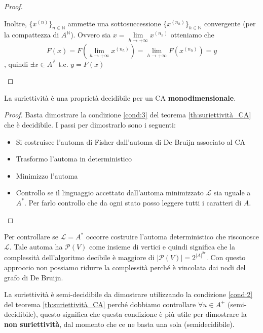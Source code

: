 \begin{teorema}
\begin{proof}
\begin{itemize}
                  Inoltre, $\{x^{(n)}\}_{n\in \mathbb{N}}$ ammette una sottosuccessione
                  $\{x^{(n_h)}\}_{h\in \mathbb{N}}$ convergente (per la compattezza di $A^{\mathbb{N}}$).
                  Ovvero sia $x= \lim\limits_{h\rightarrow +\infty}x ^{(n_h)}$ otteniamo  che $$ F(x)= F(\lim\limits_{h\rightarrow +\infty}x ^{(n_h)}) = \lim\limits_{h\rightarrow +\infty} F(x^{(n_h)})=y$$,
                  quindi $\exists x \in A^\mathbb{Z}$ t.c. $y = F(x)$
        \end{itemize}
    \end{proof}
\end{teorema}

\begin{teorema}
    La suriettività è una proprietà decidibile per un CA \textbf{monodimensionale}.
    \begin{proof}
        Basta dimostrare la condizione \ref{cond:3} del teorema \ref{th:suriettività_CA}
        che è decidibile. I passi per dimostrarlo sono i seguenti:
        \begin{itemize}
            \item Si costruisce l'automa di Fisher dall'automa di De Bruijn associato al CA
            \item Trasformo l'automa in deterministico
            \item Minimizzo l'automa
            \item Controllo se il linguaggio accettato dall'automa minimizzato $\mathcal{L}$ sia
                  uguale a $A^\ast$. Per farlo controllo che da ogni stato posso leggere
                  tutti i caratteri di $A$.
        \end{itemize}
    \end{proof}
\end{teorema}
\begin{nota}
    Per controllare se $\mathcal{L} = A^\ast$ occorre costruire l'automa deterministico
    che risconosce $ \mathcal{L}$. Tale automa ha $\mathcal{P}(V)$ come insieme di
    vertici e quindi significa che la complessità dell'algoritmo decibile è maggiore
    di $|\mathcal{P}(V)| = 2^{|A|^{2r}}$. Con questo approccio non possiamo ridurre
    la complessità perché è vincolata dai nodi del grafo di De Bruijn.
\end{nota}

\begin{nota}
    La suriettività è semi-decidibile da dimostrare utilizzando la condizione \ref{cond:2}
    del teorema \ref{th:suriettività_CA} perché dobbiamo controllare $\forall u \in A^+$ (semi-decidibile),
    questo significa che questa condizione è più utile per dimostrare la \textbf{non
        suriettività}, dal momento che ce ne basta una sola (semidecidibile).
\end{nota}

